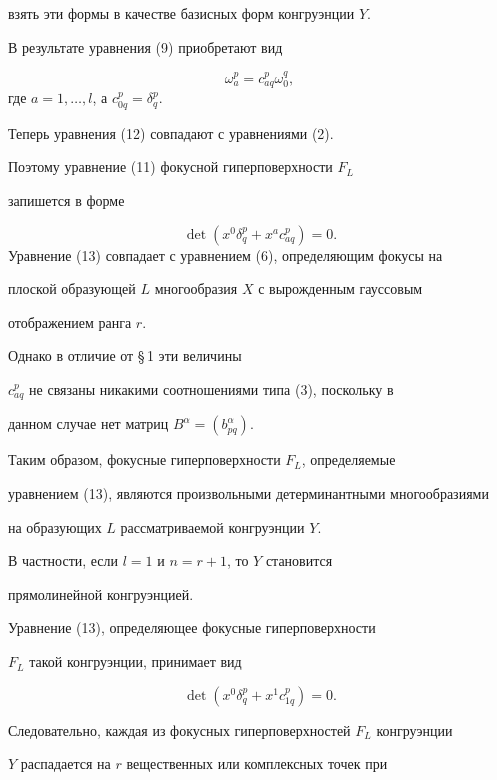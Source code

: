 взять эти формы в качестве базисных форм конгруэнции $Y$.


 В результате уравнения (9) приобретают вид


\begin{equation}\label{18}
 \omega_a^p = c_{aq}^p \omega_0^q,
\end{equation}
где $a = 1, \dotsc , l$, а $c_{0q}^p = \delta_q^p$.


Теперь уравнения (12) совпадают с уравнениями (2).


Поэтому уравнение (11) фокусной гиперповерхности $F_L$


запишется в форме


\begin{equation}\label{19}
 \det (x^0 \delta_q^p + x^a c_{aq}^p) = 0.
\end{equation}
Уравнение (13) совпадает с уравнением (6), определяющим фокусы на


плоской образующей $L$ многообразия $X$ с вырожденным гауссовым


отображением ранга $r$.


Однако в отличие от \S\,1 эти величины


$c_{aq}^p$ не связаны никакими соотношениями типа (3), поскольку в


данном случае нет матриц $B^\alpha = (b_{pq}^\alpha)$.


Таким образом, фокусные гиперповерхности $F_L$, определяемые


уравнением (13), являются произвольными детерминантными многообразиями


на образующих $L$ рассматриваемой конгруэнции $Y$.





В частности, если $l = 1$ и $n = r + 1$, то $Y$ становится


прямолинейной конгруэнцией.


Уравнение (13), определяющее фокусные гиперповерхности


$F_L$ такой конгруэнции, принимает вид


\begin{equation*}


 \det (x^0 \delta_q^p + x^1 c_{1q}^p) = 0.
\end{equation*}


 Следовательно, каждая из фокусных гиперповерхностей $F_L$ конгруэнции


$Y$ распадается на $r$ вещественных или комплексных точек при



